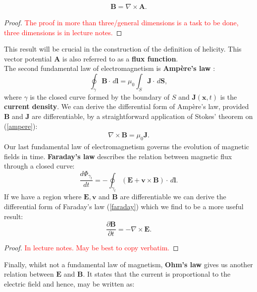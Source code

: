 \begin{align}
    \mathbf{B}=\nabla\times\mathbf{A}.
\end{align}
\begin{proof}
    \textcolor{red}{The proof in more than three/general dimensions is a task to be done, three dimensions is in lecture notes.}
\end{proof}
This result will be crucial in the construction of the definition of helicity. This vector potential $\mathbf{A}$ is also referred to as a \textbf{flux function}. \\
The second fundamental law of electromagnetism is \textbf{Ampère's law} \cite{ampere}:
\begin{equation}
    \oint_\gamma \mathbf{B}\cdot\,d\mathbf{l} = \mu_0\int_S \mathbf{J}\cdot\, d\mathbf{S}, \label{ampere}
\end{equation}
where $\gamma$ is the closed curve formed by the boundary of $S$ and $\mathbf{J}(\mathbf{x},t)$ is the \textbf{current density}. We can derive the differential form of Ampère's law, provided $\mathbf{B}$ and $\mathbf{J}$ are differentiable, by a straightforward application of Stokes' theorem on (\ref{ampere}):
\begin{align}
    \nabla \times \mathbf{B} = \mu_0 \mathbf{J}. \label{diff_ampere}
\end{align}
Our last fundamental law of electromagnetism governs the evolution of magnetic fields in time. \textbf{Faraday's law} \cite{ampere} describes the relation between magnetic flux through a closed curve:
\begin{equation}
    \frac{d\Phi_{\gamma_t}}{dt} = -\oint_{\gamma_t} (\mathbf{E}+\mathbf{v}\times\mathbf{B})\cdot\, d\mathbf{l}. \label{faraday} %
\end{equation}
If we have a region where $\mathbf{E}, \mathbf{v}$ and $\mathbf{B}$ are differentiable we can derive the differential form of Faraday's law (\ref{faraday}) which we find to be a more useful result:
\begin{equation}
    \frac{\partial \mathbf{B}}{\partial t} = - \nabla \times \mathbf{E}. \label{diff_faraday}
\end{equation}
\begin{proof}
    \textcolor{red}{In lecture notes. May be best to copy verbatim.}
\end{proof}
Finally, whilst not a fundamental law of magnetism, \textbf{Ohm's law} \cite{ohms} gives us another relation between $\mathbf{E}$ and $\mathbf{B}$. It states that the current is proportional to the electric field and hence, may be written as:
